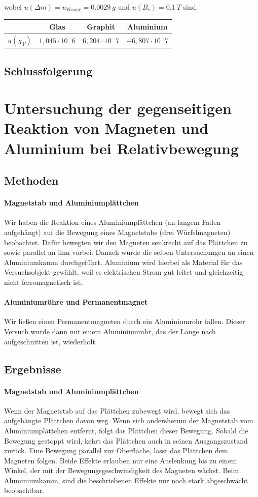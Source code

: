 \documentclass[
	a4paper,
	12pt,
	pagesize,
	ngerman
]{scrartcl}
\begin{document}
	wobei $u(\Delta m) = u_\text{Waage} = \SI{0,0029}{g}$ und $u(B_r) = \SI{0.1}{T}$ sind.

	\begin{tabular}{ r | c | c | c}
		& Glas & Graphit & Aluminium \\ \hline
		$u(\chi_V) $ &$1,045 \cdot 10^-6$&$6,204 \cdot 10^-7$&$-6,807 \cdot 10^-7$\\ \hline
	\end{tabular} \newline
	



	\subsection{Schlussfolgerung}
	
	
	\section{Untersuchung der gegenseitigen Reaktion von Magneten und Aluminium bei Relativbewegung}
	\subsection{Methoden}
	\paragraph{Magnetstab und Aluminiumplättchen}
	Wir haben die Reaktion eines Aluminiumplättchen (an langem Faden aufgehängt) auf die Bewegung eines Magnetstabs (drei Würfelmagneten) beobachtet. Dafür bewegten wir den Magneten senkrecht auf das Plättchen zu sowie parallel an ihm vorbei.
	Danach wurde die selben Untersuchungen an einen Aluminiumkamm durchgeführt. Aluminium wird hierbei als Material für das Versuchsobjekt gewählt, weil es elektrischen Strom gut leitet und gleichzeitig nicht ferromagnetisch ist. 
	\paragraph{Aluminiumröhre und Permanentmagnet}
	Wir ließen einen Permanentmagneten durch ein Aluminiumrohr fallen. Dieser Versuch wurde dann mit einem Aluminiumrohr, das der Länge nach aufgeschnitten ist, wiederholt.
	\subsection{Ergebnisse}
	\paragraph{Magnetstab und Aluminiumplättchen}
	Wenn der Magnetstab auf das Plättchen zubewegt wird, bewegt sich das aufgehängte Plättchen davon weg. Wenn sich andersherum der Magnetstab vom Aluminiumplättchen entfernt, folgt das Plättchen dieser Bewegung. Sobald die Bewegung gestoppt wird, kehrt das Plättchen auch in seinen Ausgangszustand zurück. Eine Bewegung parallel zur Oberfläche, lässt das Plättchen dem Magneten folgen. Beide Effekte erlauben nur eine Auslenkung bis zu einem Winkel, der mit der Bewegungsgeschwindigkeit des Magneten wächst. %
	Beim Aluminiumkamm, sind die beschriebenen Effekte nur noch stark abgeschwächt beobachtbar.
\end{document}

